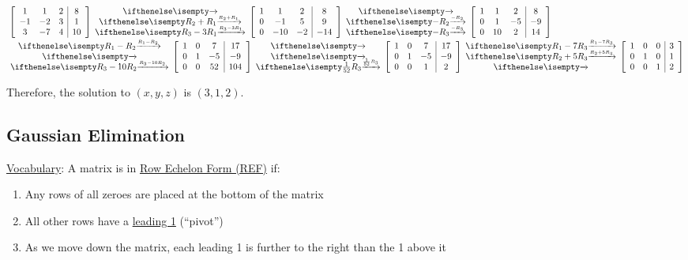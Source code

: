 \documentclass[
  letterpaper,
  DIV=11,
  numbers=noendperiod]{scrartcl}
\providecommand{\tightlist}{%
  \setlength{\itemsep}{0pt}\setlength{\parskip}{0pt}}\usepackage{longtable,booktabs,array}
\begin{document}
\begin{align*}
&\left[\begin{array}{ccc|c}
1 & 1 & 2 & 8 \\
-1 & -2 & 3 & 1 \\
3 & -7 & 4 & 10
\end{array}\right]\rowops{,R_2+R_1,R_3-3R_1}
\left[\begin{array}{ccc|c}
1 & 1 & 2 & 8 \\
0 & -1 & 5 & 9 \\
0 & -10 & -2 & -14
\end{array}\right]\rowops{,-R_2, -R_3}\left[\begin{array}{ccc|c}
1 & 1 & 2 & 8 \\
0 & 1 & -5 & -9 \\
0 & 10 & 2 & 14
\end{array}\right] \\
&\rowops{R_1-R_2,,R_3-10R_2}\left[\begin{array}{ccc|c}
1 & 0 & 7 & 17 \\
0 & 1 & -5 & -9 \\
0 & 0 & 52 & 104
\end{array}\right]\rowops{,,\frac{1}{52}R_3}\left[\begin{array}{ccc|c}
1 & 0 & 7 & 17 \\
0 & 1 & -5 & -9 \\
0 & 0 & 1 & 2
\end{array}\right]\rowops{R_1-7R_3,R_2+5R_3,}\left[\begin{array}{ccc|c}
1 & 0 & 0 & 3 \\
0 & 1 & 0 & 1 \\
0 & 0 & 1 & 2
\end{array}\right]
\end{align*}

Therefore, the solution to \((x, y, z)\) is \((3, 1, 2)\).

\subsection{Gaussian Elimination}\label{gaussian-elimination}

\ul{Vocabulary}: A matrix is in \ul{Row Echelon Form (REF)} if:

\begin{enumerate}
\def\labelenumi{(\alph{enumi})}
\tightlist
\item
  Any rows of all zeroes are placed at the bottom of the matrix
\item
  All other rows have a \ul{leading 1} (``pivot'')
\item
  As we move down the matrix, each leading 1 is further to the right
  than the 1 above it
\end{enumerate}
\end{document}
